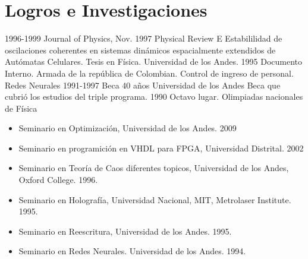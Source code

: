 \section{Logros e Investigaciones}

\begin{entrylist}
  \entry
	{1996-1999}
	{Journal of Physics, Nov. 1997}
	{Physical Review E}
	{Estabililidad de oscilaciones coherentes en sistemas dinámicos espacialmente extendidos de Autómatas Celulares.
	Tesis en Física. Universidad de los Andes.}
  \entry
	{1995}
	{Documento Interno.}
	{Armada de la república de Colombian.}
	{Control de ingreso de personal. Redes Neurales}
  \entry
	{1991-1997}
	{Beca 40 años}
	{Universidad de los Andes}
	{Beca que cubrió los estudios del triple programa.}
  \entry
	{1990}
	{Octavo lugar.}
	{Olimpiadas nacionales de Física}
	{}
\end{entrylist}

\begin{itemize}
	\item Seminario en Optimización, Universidad de los Andes. 2009
	\item Seminario en programición en VHDL para FPGA, Universidad Distrital. 2002
	\item Seminario en Teoría de Caos diferentes topicos, Universidad de los Andes, Oxford College. 1996.
	\item Seminario en Holografía, Universidad Nacional, MIT, Metrolaser Institute. 1995.
	\item Seminario en Reescritura, Universidad de los Andes. 1995.
	\item Seminario en Redes Neurales. Universidad de los Andes. 1994.
\end{itemize}
